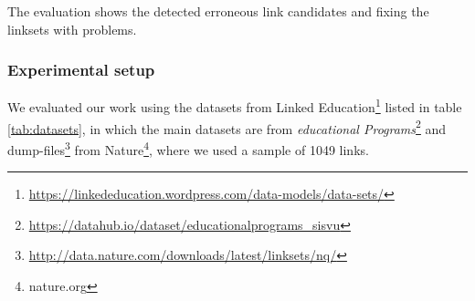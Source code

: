
The evaluation shows the detected erroneous link candidates and fixing the linksets with problems. 

\subsubsection{Experimental setup}

We evaluated our work using the datasets from Linked Education\footnote{\url{https://linkededucation.wordpress.com/data-models/data-sets/}} listed in table \ref{tab:datasets}, in which the main datasets are from \emph{educational Programs}\footnote{\url{https://datahub.io/dataset/educationalprograms_sisvu}} and dump-files\footnote{\url{http://data.nature.com/downloads/latest/linksets/nq/}} from Nature\footnote{nature.org}, where we used a sample of 1049 links.

\begin{table}[htb] 
\centering
\caption{Educational Datasets}
\label{tab:datasets}
\end{table}


